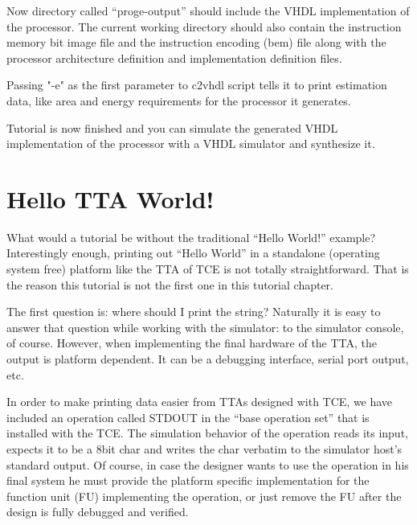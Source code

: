 \documentclass[twoside]{tceusermanual}
\begin{document}

Now directory called ``proge-output'' should include the VHDL implementation
of the processor.
The current working directory should also contain the instruction memory bit
image file and the instruction encoding (bem) file along with the processor
architecture definition and implementation definition files.

Passing "-e" as the first parameter to c2vhdl script tells it to print
estimation data, like area and energy requirements for the processor it
generates.

Tutorial is now finished and you can simulate the generated VHDL
implementation of the processor with a VHDL simulator and synthesize it.


%



\section{Hello TTA World!}

What would a tutorial be without the traditional ``Hello World!''
example? Interestingly enough, printing out ``Hello World'' in a
standalone (operating system free) platform like the TTA of TCE is not 
totally straightforward. That is the reason this tutorial is not the first 
one in this tutorial chapter.

The first question is: where should I print the string? Naturally 
it is easy to answer that question while working with the simulator: to
the simulator console, of course. However, when implementing the final
hardware of the TTA, the output is platform dependent. It can be a
debugging interface, serial port output, etc.

In order to make printing data easier from TTAs designed
with TCE, we have included an operation called STDOUT in the ``base operation 
set'' that is installed with the TCE. The simulation behavior of the 
operation reads its input, expects it to be a 8bit char and writes the char
verbatim to the simulator host's standard output. Of course, in case the 
designer wants to use the operation in his final system he must provide the 
platform specific implementation for the function unit (FU) implementing the 
operation, or just remove the FU after the design is fully debugged and
verified.
\end{document}
